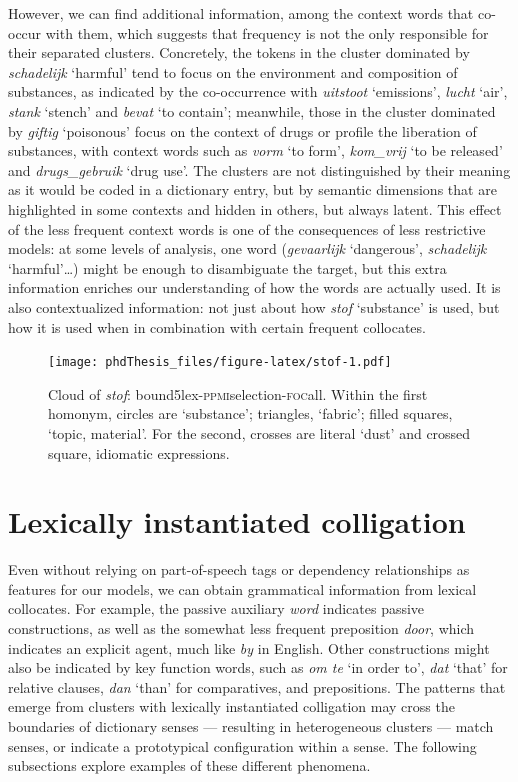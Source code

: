 \documentclass[
]{book}
\begin{document}
However, we can find additional information, among the context words that co-occur with them, which suggests that frequency is not the only responsible for their separated clusters. Concretely, the tokens in the cluster dominated by \emph{schadelijk} `harmful' tend to focus on the environment and composition of substances, as indicated by the co-occurrence with \emph{uitstoot} `emissions', \emph{lucht} `air', \emph{stank} `stench' and \emph{bevat} `to contain'; meanwhile, those in the cluster dominated by \emph{giftig} `poisonous' focus on the context of drugs or profile the liberation of substances, with context words such as \emph{vorm} `to form', \emph{kom\_vrij} `to be released' and \emph{drugs\_gebruik} `drug use'. The clusters are not distinguished by their meaning as it would be coded in a dictionary entry, but by semantic dimensions that are highlighted in some contexts and hidden in others, but always latent.
This effect of the less frequent context words is one of the consequences of less restrictive models: at some levels of analysis, one word (\emph{gevaarlijk} `dangerous', \emph{schadelijk} `harmful'\ldots) might be enough to disambiguate the target, but this extra information enriches our understanding of how the words are actually used. It is also contextualized information: not just about how \emph{stof} `substance' is used, but how it is used when in combination with certain frequent collocates.



\begin{figure}
\centering
\texttt{[image: phdThesis\_files/figure-latex/stof-1.pdf]}
\caption{\label{fig:stof}Cloud of \emph{stof}: bound5lex-\textsc{ppmi}selection-\textsc{foc}all. Within the first homonym, circles are `substance'; triangles, `fabric'; filled squares, `topic, material'. For the second, crosses are literal `dust' and crossed square, idiomatic expressions.}
\end{figure}

\hypertarget{colligation}{%
\section{Lexically instantiated colligation}\label{colligation}}

Even without relying on part-of-speech tags or dependency relationships as features for our models, we can obtain grammatical information from lexical collocates. For example, the passive auxiliary \emph{word} indicates passive constructions, as well as the somewhat less frequent preposition \emph{door}, which indicates an explicit agent, much like \emph{by} in English. Other constructions might also be indicated by key function words, such as \emph{om te} `in order to', \emph{dat} `that' for relative clauses, \emph{dan} `than' for comparatives, and prepositions. The patterns that emerge from clusters with lexically instantiated colligation may cross the boundaries of dictionary senses --- resulting in heterogeneous clusters --- match senses, or indicate a prototypical configuration within a sense. The following subsections explore examples of these different phenomena.
\end{document}
